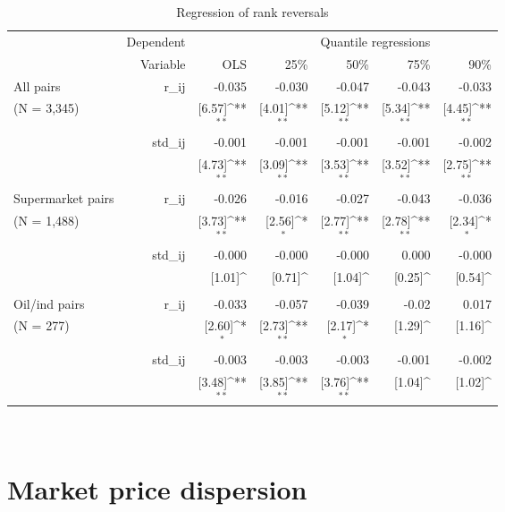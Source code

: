 \documentclass[english]{article}
\begin{document}

\begin{table}[H]
\centering
\def\sym#1{\ifmmode^{#1}\else\[^{#1}\]\fi}
\caption{Regression of rank reversals}
\sisetup{table-space-text-post = \sym{***}}
\begin{tabular}{lrrrrrr}
\hline
\hline
\textbf{} & Dependent &       & \multicolumn{4}{c}{Quantile regressions} \\
      & Variable & OLS   & 25\%  & 50\%  & 75\%  & 90\% \\
\hline
All pairs & r\_ij & -0.035 & -0.030 & -0.047 & -0.043 & -0.033 \\
(N = 3,345) &       & [6.57]\sym{**} & [4.01]\sym{**} & [5.12]\sym{**} & [5.34]\sym{**} & [4.45]\sym{**} \\
      & std\_ij & -0.001 & -0.001 & -0.001 & -0.001 & -0.002 \\
      &       & [4.73]\sym{**} & [3.09]\sym{**} & [3.53]\sym{**} & [3.52]\sym{**} & [2.75]\sym{**} \\
Supermarket pairs & r\_ij & -0.026 & -0.016 & -0.027 & -0.043 & -0.036 \\
 (N = 1,488) &       & [3.73]\sym{**} & [2.56]\sym{*} & [2.77]\sym{**} & [2.78]\sym{**} & [2.34]\sym{*} \\
      & std\_ij & -0.000 & -0.000 & -0.000 & 0.000 & -0.000 \\
      &       & [1.01]\sym{} & [0.71]\sym{} & [1.04]\sym{} & [0.25]\sym{} & [0.54]\sym{} \\
Oil/ind pairs & r\_ij & -0.033 & -0.057 & -0.039 & -0.02 & 0.017 \\
 (N = 277) &       & [2.60]\sym{*} & [2.73]\sym{**} & [2.17]\sym{*} & [1.29]\sym{} & [1.16]\sym{} \\
      & std\_ij & -0.003 & -0.003 & -0.003 & -0.001 & -0.002 \\
      &       & [3.48]\sym{**} & [3.85]\sym{**} & [3.76]\sym{**} & [1.04]\sym{} & [1.02]\sym{} \\
\hline
\hline
\end{tabular}%
\\
\end{table}

\section{Market price dispersion}
\end{document}
